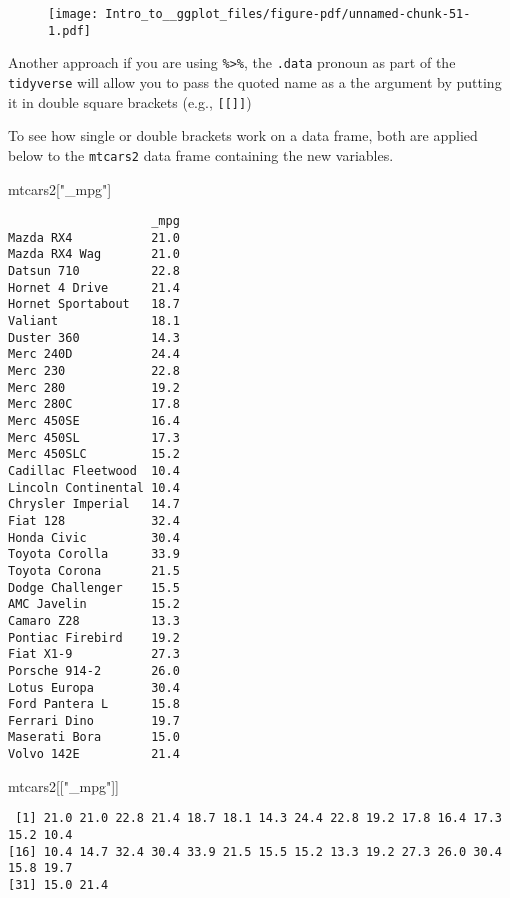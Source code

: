 \documentclass[
  letterpaper,
  DIV=11,
  numbers=noendperiod]{scrartcl}
\newenvironment{Shaded}{\begin{snugshade}}{\end{snugshade}}
\newcommand{\NormalTok}[1]{\textcolor[rgb]{0.00,0.23,0.31}{#1}}
\newcommand{\StringTok}[1]{\textcolor[rgb]{0.13,0.47,0.30}{#1}}
\begin{document}
\begin{figure}[H]

{\centering \texttt{[image: Intro\_to\_\_ggplot\_files/figure-pdf/unnamed-chunk-51-1.pdf]}

}

\end{figure}

Another approach if you are using \texttt{\%\textgreater{}\%}, the
\texttt{.data} pronoun as part of the \texttt{tidyverse} will allow you
to pass the quoted name as a the argument by putting it in double square
brackets (e.g., \texttt{{[}{[}{]}{]}})

To see how single or double brackets work on a data frame, both are
applied below to the \texttt{mtcars2} data frame containing the new
variables.

\begin{Shaded}
\begin{Highlighting}[]
\NormalTok{mtcars2[}\StringTok{"\_mpg"}\NormalTok{]}
\end{Highlighting}
\end{Shaded}

\begin{verbatim}
                    _mpg
Mazda RX4           21.0
Mazda RX4 Wag       21.0
Datsun 710          22.8
Hornet 4 Drive      21.4
Hornet Sportabout   18.7
Valiant             18.1
Duster 360          14.3
Merc 240D           24.4
Merc 230            22.8
Merc 280            19.2
Merc 280C           17.8
Merc 450SE          16.4
Merc 450SL          17.3
Merc 450SLC         15.2
Cadillac Fleetwood  10.4
Lincoln Continental 10.4
Chrysler Imperial   14.7
Fiat 128            32.4
Honda Civic         30.4
Toyota Corolla      33.9
Toyota Corona       21.5
Dodge Challenger    15.5
AMC Javelin         15.2
Camaro Z28          13.3
Pontiac Firebird    19.2
Fiat X1-9           27.3
Porsche 914-2       26.0
Lotus Europa        30.4
Ford Pantera L      15.8
Ferrari Dino        19.7
Maserati Bora       15.0
Volvo 142E          21.4
\end{verbatim}

\begin{Shaded}
\begin{Highlighting}[]
\NormalTok{mtcars2[[}\StringTok{"\_mpg"}\NormalTok{]]}
\end{Highlighting}
\end{Shaded}

\begin{verbatim}
 [1] 21.0 21.0 22.8 21.4 18.7 18.1 14.3 24.4 22.8 19.2 17.8 16.4 17.3 15.2 10.4
[16] 10.4 14.7 32.4 30.4 33.9 21.5 15.5 15.2 13.3 19.2 27.3 26.0 30.4 15.8 19.7
[31] 15.0 21.4
\end{verbatim}
\end{document}
